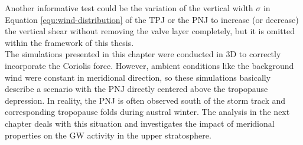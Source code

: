 Another informative test could be the variation of the vertical width $\sigma$ in Equation \ref{equ:wind-distribution} of the TPJ or the PNJ to increase (or decrease) the vertical shear without removing the valve layer completely, but it is omitted within the framework of this thesis. \\
The simulations presented in this chapter were conducted in 3D to correctly incorporate the Coriolis force. However, ambient conditions like the background wind were constant in meridional direction, so these simulations basically describe a scenario with the PNJ directly centered above the tropopause depression. In reality, the PNJ is often observed south of the storm track and corresponding tropopause folds during austral winter. The analysis in the next chapter deals with this situation and investigates the impact of meridional properties on the GW activity in the upper stratosphere.